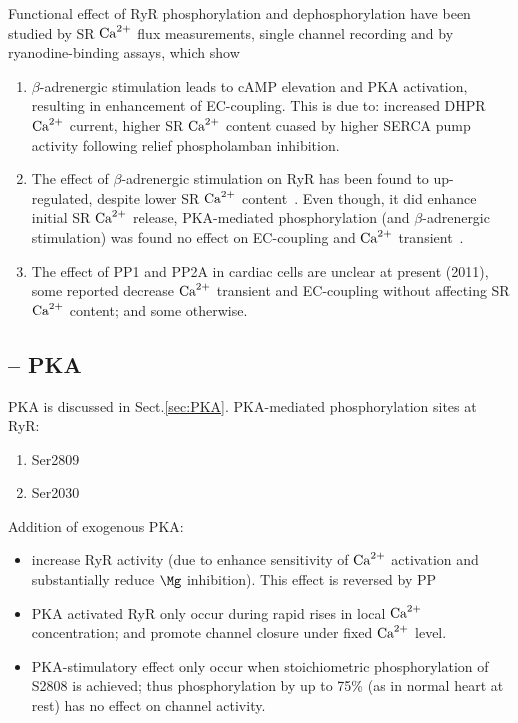 Functional effect of RyR phosphorylation and dephosphorylation have been studied
by SR ${\text{Ca}^{2+}}$ flux measurements, single channel recording and by ryanodine-binding
assays, which show
\begin{enumerate}
  \item $\beta$-adrenergic stimulation leads to cAMP elevation and PKA
  activation, resulting in enhancement of EC-coupling. This is due to: increased
  DHPR ${\text{Ca}^{2+}}$ current, higher SR ${\text{Ca}^{2+}}$ content cuased by higher SERCA pump
  activity following relief phospholamban inhibition. 

  \item The effect of $\beta$-adrenergic stimulation on RyR has been found to
  up-regulated, despite lower SR ${\text{Ca}^{2+}}$ content~\citep{Lindegger2005}. Even
  though, it did enhance initial SR ${\text{Ca}^{2+}}$ release, PKA-mediated phosphorylation
  (and $\beta$-adrenergic stimulation) was found no effect on
  EC-coupling and ${\text{Ca}^{2+}}$ transient~\citep{Ginsburg2004}.
 
 \item The effect of PP1 and PP2A in cardiac cells are unclear at present
 (2011), some reported decrease ${\text{Ca}^{2+}}$ transient and EC-coupling without
 affecting SR ${\text{Ca}^{2+}}$ content; and some otherwise.
\end{enumerate}

\subsection{-- PKA}
\label{sec:PKA-RyR}

PKA is discussed in Sect.\ref{sec:PKA}. 
PKA-mediated phosphorylation sites at RyR:
\begin{enumerate}
  \item  Ser2809
  
  \item Ser2030 
\end{enumerate}

Addition of exogenous PKA:

  \begin{itemize}
    \item increase RyR activity (due to enhance   sensitivity of ${\text{Ca}^{2+}}$
    activation and substantially reduce $\Mg$ inhibition).  This effect is reversed by PP
    
    \item PKA activated RyR only occur during rapid rises in local ${\text{Ca}^{2+}}$
  concentration; and promote channel closure under fixed ${\text{Ca}^{2+}}$ level.
  
    \item PKA-stimulatory effect only occur when stoichiometric phosphorylation
  of S2808 is achieved; thus phosphorylation by up to 75\% (as in normal heart at
  rest) has no effect on channel activity.
  \end{itemize} 


